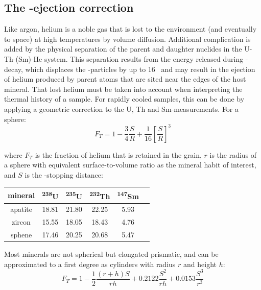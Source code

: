 \begin{refsection}
\section{The \textalpha-ejection correction}\label{sec:alpha-ejection}

Like argon, helium is a noble gas that is lost to the environment (and
eventually to space) at high temperatures by volume diffusion.
Additional complication is added by the physical separation of the
parent and daughter nuclides in the U-Th-(Sm)-He system. This
separation results from the energy released during \textalpha-decay,
which displaces the \textalpha-particles by up to 16~ and may
result in the ejection of helium produced by parent atoms that are
sited near the edges of the host mineral. That lost helium must be
taken into account when interpreting the thermal history of a
sample. For rapidly cooled samples, this can be done by applying a
geometric correction to the U, Th and Sm-measurements. For a sphere:
\begin{equation}
  F_T = 1 - \frac{3}{4}\frac{S}{R} + \frac{1}{16} \left[\frac{S}{R}\right]^3
    \label{eq:FTsphere}
\end{equation}

\noindent where $F_T$ is the fraction of helium that is retained in
the grain, $r$ is the radius of a sphere with equivalent
surface-to-volume ratio as the mineral habit of interest, and $S$ is
the \textalpha-stopping distance:

\begin{center}
\begin{tabular}{cccccc}
  mineral & \textsuperscript{238}U & \textsuperscript{235}U
  & \textsuperscript{232}Th & \textsuperscript{147}Sm \\ \hline
  apatite & 18.81 & 21.80 & 22.25 & 5.93 \\
  zircon & 15.55 & 18.05 & 18.43 & 4.76 \\
  sphene & 17.46 & 20.25 & 20.68 & 5.47
\end{tabular}
\label{tab:stoppingdistances}
\end{center}

Most minerals are not spherical but elongated prismatic, and can be
approximated to a first degree as cylinders with radius $r$ and height
$h$:
\begin{equation}
  F_T = 1 - \frac{1}{2}\frac{(r+h)S}{rh} +
  0.2122 \frac{S^2}{rh} + 0.0153 \frac{S^3}{r^3}
  \label{eq:FTcylinder}
\end{equation}


\end{refsection}
